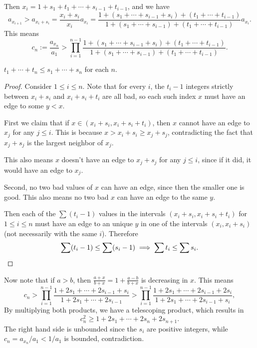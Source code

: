 \documentclass[11pt]{scrartcl}
\begin{document}
Then $x_i = 1 + s_1 + t_1 + \dotsb + s_{i - 1} + t_{i - 1}$, and we have
\[a_{x_{i + 1}} > a_{x_i + s_i} = \frac{x_i + s_i}{x_i} a_{x_i} = \frac{1 + (s_1
  + \dotsb + s_{i - 1} + s_i) + (t_1 + \dotsb + t_{i - 1})}{1 + (s_1 + \dotsb +
s_{i - 1}) + (t_1 + \dotsb + t_{i - 1})}a_{x_i}.\] This means
\[c_n := \frac{a_{x_n}}{a_1} > \prod_{i = 1}^{n-1} \frac{1 + (s_1 + \dotsb +
s_{i-1} + s_{i}) + (t_1 + \dotsb + t_{i-1})}{1 + (s_1 + \dotsb + s_{i-1}) + (t_1
+ \dotsb + t_{i-1})}.\]

\begin{lemma*}
  $t_1 + \dotsb + t_n \leq s_1 + \dotsb + s_n$ for each $n$.
\end{lemma*}

\begin{proof}
  Consider $1 \leq i \leq n$. Note that for every $i$, the $t_i - 1$ integers strictly between $x_i + s_i$ and $x_i + s_i + t_i$ are all bad, so each such index $x$ must have an edge to some $y < x$.

  First we claim that if $x \in (x_i + s_i, x_i + s_i + t_i)$, then $x$ cannot
  have an edge to $x_j$ for any $j \leq i$. This is because $x > x_i + s_i
  \geq x_j + s_j$, contradicting the fact that $x_j + s_j$ is the largest
  neighbor of $x_j$.

  This also means $x$ doesn't have an edge to $x_j + s_j$ for any $j \leq i$, since if it did, it would have an edge to $x_j$.

  Second, no two bad values of $x$ can have an edge, since then the smaller
  one is good. This also means no two bad $x$ can have an edge to the same $y$.

  Then each of the $\sum (t_i - 1)$ values in the intervals $(x_i+s_i,
  x_i+s_i+t_i)$ for $1 \leq i \leq n$ must have an edge to an unique $y$ in one
  of the intervals $(x_i, x_i + s_i)$ (not necessarily with the same $i$). Therefore
  \[\sum (t_i - 1) \leq \sum (s_i - 1)\implies \sum t_i \leq \sum s_i.\qedhere\]
\end{proof}

Now note that if $a > b$, then $\frac{a + x}{b + x} = 1 + \frac{a - b}{b + x}$
is decreasing in $x$. This means
\[c_n > \prod_{i = 1}^{n-1} \frac{1 + 2s_1 + \dotsb + 2s_{i-1} + s_{i}}{1 + 2s_1
    + \dotsb + 2s_{i-1}} > \prod_{i = 1}^{n-1} \frac{1 + 2s_1 + \dotsb +
    2s_{i-1} + 2s_{i}}{1 + 2s_1 + \dotsb + 2s_{i-1} + s_{i}},\]
By multiplying both products, we have a telescoping product, which results in
\[c_n^2 \geq 1 + 2s_1 + \dotsb + 2s_n + 2s_{n + 1}.\]
The right hand side is unbounded since the $s_i$ are positive integers, while
$c_n = a_{x_n}/a_1 < 1/a_1$ is bounded, contradiction.
\end{document}
